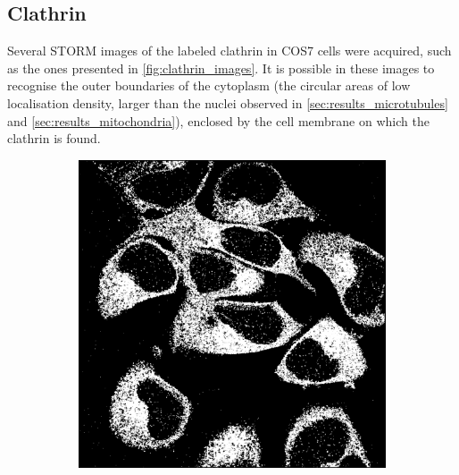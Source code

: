 \subsection{Clathrin} \label{sec:results_clathrin}
Several STORM images of the labeled clathrin in COS7 cells were acquired, such as the ones presented in \autoref{fig:clathrin_images}.
It is possible in these images to recognise the outer boundaries of the cytoplasm (the circular areas of low localisation density, larger than the nuclei observed in \autoref{sec:results_microtubules} and \autoref{sec:results_mitochondria}), enclosed by the cell membrane on which the clathrin is found.

\begin{figure}
    \begin{subfigure}{0.32\textwidth}
        \includegraphics[width=\textwidth]{figures/clathrin_image11.png}
        \caption{}
        \label{fig:clathrin_image1}
    \end{subfigure}
    \begin{subfigure}{0.32\textwidth}

\end{subfigure}
\end{figure}

